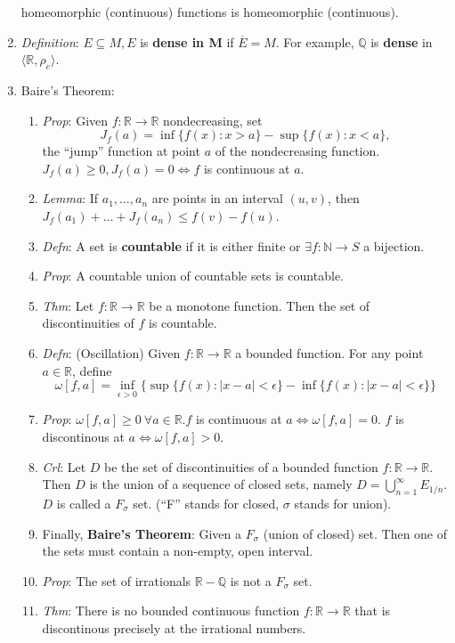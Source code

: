 \documentclass[10pt]{article}
\newcommand{\real}{\mathbb{R}}
\newcommand{\nat}{\mathbb{N}}
\begin{document}
\begin{multicols*}{3}
\begin{enumerate}
			homeomorphic (continuous) functions is homeomorphic (continuous).
		\item \emph{Definition}: $E\subseteq M, E$ is \textbf{dense in M} if
			$\overline{E}=M$. For example, $\mathbb{Q}$ is \textbf{dense} in
			$\langle\real,\rho_{e}\rangle$.
			\item  Baire's Theorem:
			\begin{enumerate}
				\item \emph{Prop}: Given $f:\real\to\real$ nondecreasing, set
				\[J_{f}(a)=\inf\{f(x):x>a\}-\sup\{f(x):x<a\},\] the ``jump'' function
				at point $a$ of the nondecreasing function.
				$J_{f}(a)\geq0,J_{f}(a)=0\iff f$ is continuous at $a$.
				\item \emph{Lemma}: If $a_{1},\dots,a_{n}$ are points in an interval
				$(u,v)$, then $J_{f}(a_{1})+\dots+J_{f}(a_{n})\leq f(v)-f(u)$.
				\item \emph{Defn}: A set is \textbf{countable} if it is either finite or
				$\exists f:\nat\to S$ a bijection.
				\item \emph{Prop}: A countable union of countable sets is countable.
				\item \emph{Thm}: Let $f:\real\to\real$ be a monotone function. Then the
				set of discontinuities of $f$ is countable.
				\item \emph{Defn}: (Oscillation) Given $f:\real\to\real$ a bounded
				function. For any point $a\in\real$,
				define \[\omega[f,a]=\inf\limits_{\epsilon>0}\{\sup\{f(x):
					|x-a|<\epsilon\}-\inf\{f(x):|x-a|<\epsilon\}\}\]
				\item \emph{Prop}: $\omega[f,a]\geq0\ \forall a\in\real. f$ is
					continuous at $a \iff\omega[f,a]=0$. $f$ is discontinous at
					$a\iff\omega[f,a]>0$.
					\item \emph{Crl}: Let $D$ be the set of discontinuities of a bounded
					function $f:\real\to\real$. Then $D$ is the union of a sequence of
					closed sets, namely $D=\bigcup\limits^{\infty}_{n=1}E_{1/n}$.
					$D$ is called a $F_{\sigma}$ set. (``F'' stands for closed, $\sigma$
					stands for union).
					\item Finally, \textbf{Baire's Theorem}: Given a $F_{\sigma}$ (union of closed)
			set. Then one of the sets must contain a non-empty, open interval.
			\item \emph{Prop}: The set of irrationals $\real-\mathbb{Q}$ is not a
			$F_{\sigma}$ set.
			\item \emph{Thm}: There is no bounded continuous function
			$f:\real\to\real$ that is discontinous precisely at the irrational numbers.
			\end{enumerate}
	\end{enumerate}



\end{multicols*}
\end{document}
